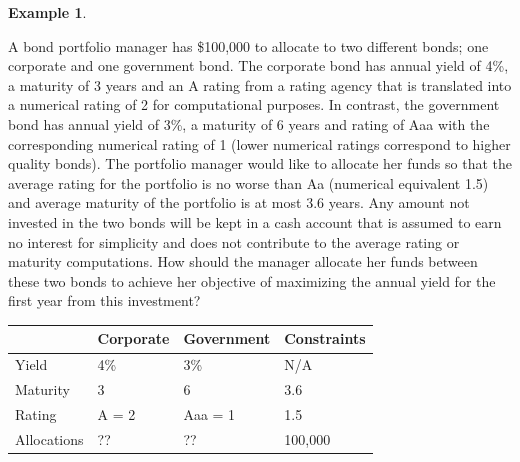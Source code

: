 \documentclass[
]{book}
\theoremstyle{definition}
\theoremstyle{definition}
\newtheorem{example}{Example}[chapter]
\theoremstyle{definition}
\theoremstyle{definition}
\theoremstyle{remark}
\begin{document}
\begin{example}
\protect\hypertarget{exm:bond-portfolio}{}\label{exm:bond-portfolio}

A bond portfolio manager has \$100,000 to allocate to two different bonds; one corporate and one government bond.
The corporate bond has annual yield of 4\%, a maturity of 3 years and an A rating from a rating agency that is translated into a numerical rating of 2 for computational purposes.
In contrast, the government bond has annual yield of 3\%, a maturity of 6 years and rating of Aaa with the corresponding numerical rating of 1 (lower numerical ratings correspond to higher quality bonds). The portfolio manager would like to allocate her funds so that the average rating for the portfolio is no worse than Aa (numerical equivalent 1.5) and average maturity of the portfolio is at most 3.6 years.
Any amount not invested in the two bonds will be kept in a cash account that is assumed to earn no interest for simplicity and does not contribute to the average rating or maturity computations.
How should the manager allocate her funds between these two bonds to achieve her objective of maximizing the annual yield for the first year from this investment? \citep{optimization-methods-in-finance}

\begin{longtable}[]{@{}llll@{}}
\toprule()
& Corporate & Government & Constraints \\
\midrule()
\endhead
Yield & 4\% & 3\% & N/A \\
Maturity & 3 & 6 & 3.6 \\
Rating & A = 2 & Aaa = 1 & 1.5 \\
Allocations & ?? & ?? & 100,000 \\
\bottomrule()
\end{longtable}

\end{example}
\end{document}
